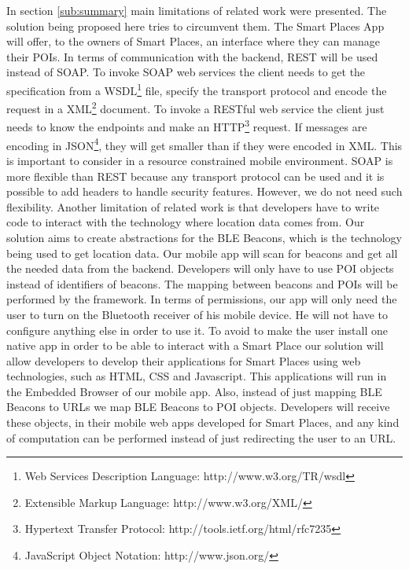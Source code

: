 In section \ref{sub:summary} main limitations of
related work were presented.
The solution being proposed here tries to
circumvent them. The Smart Places App will
offer, to the owners of Smart Places, an interface
where they can manage their POIs.
In terms of communication with the backend,
REST\cite{richardson2008restful} will be used instead
of SOAP. To invoke SOAP web services the client needs
to get the specification from a 
WSDL\footnote{Web Services Description Language:
http://www.w3.org/TR/wsdl} file, specify the
transport protocol and encode the request in a
XML\footnote{Extensible Markup Language:
http://www.w3.org/XML/} document. To invoke a
RESTful web service the client just needs to know
the endpoints and make an 
HTTP\footnote{Hypertext Transfer Protocol:
http://tools.ietf.org/html/rfc7235} request.
If messages are encoding in 
JSON\footnote{JavaScript Object Notation:
http://www.json.org/}, they will
get smaller than if they were encoded in XML.
This is important to consider in a resource constrained
mobile environment. SOAP is more flexible than REST
because any transport protocol can be used and it is
possible to add headers to handle security features.
However, we do not need such flexibility.
Another limitation of related work is that developers
have to write code to interact with the technology
where location data comes from. Our solution aims to
create abstractions for the BLE Beacons, which is the
technology being used to get location data.
Our mobile app will scan for beacons and get all the
needed data from the backend. Developers will only have
to use POI objects instead of identifiers of beacons.
The mapping between beacons and POIs will be performed
by the framework.
In terms of permissions, our app will only need the
user to turn on the Bluetooth receiver of his
mobile device. He will not have to configure
anything else in order to use it.
To avoid to make the user install one native app
in order to be able to interact with a Smart Place
our solution will allow developers to develop their
applications for Smart Places using web technologies,
such as HTML, CSS and Javascript. This applications
will run in the Embedded Browser of our mobile app.
Also, instead of just mapping BLE Beacons to URLs we map
BLE Beacons to POI objects. Developers will receive
these objects, in their mobile web apps developed for
Smart Places, and any kind of computation can be 
performed instead of just redirecting the user to an
URL.


